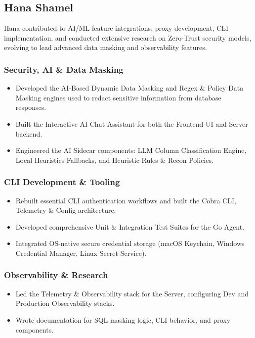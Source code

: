
\subsection{Hana Shamel}

Hana contributed to AI/ML feature integrations, proxy development, CLI implementation, and conducted extensive research on Zero-Trust security models, evolving to lead advanced data masking and observability features.

\subsubsection{Security, AI \& Data Masking}
\begin{itemize}
    \item Developed the AI-Based Dynamic Data Masking and Regex \& Policy Data Masking engines used to redact sensitive information from database responses.
    \item Built the Interactive AI Chat Assistant for both the Frontend UI and Server backend.
    \item Engineered the AI Sidecar components: LLM Column Classification Engine, Local Heuristics Fallbacks, and Heuristic Rules \& Recon Policies.
\end{itemize}

\subsubsection{CLI Development \& Tooling}
\begin{itemize}
    \item Rebuilt essential CLI authentication workflows and built the Cobra CLI, Telemetry \& Config architecture.
    \item Developed comprehensive Unit \& Integration Test Suites for the Go Agent.
    \item Integrated OS-native secure credential storage (macOS Keychain, Windows Credential Manager, Linux Secret Service).
\end{itemize}

\subsubsection{Observability \& Research}
\begin{itemize}
    \item Led the Telemetry \& Observability stack for the Server, configuring Dev and Production Observability stacks.
    \item Wrote documentation for SQL masking logic, CLI behavior, and proxy components.
\end{itemize}

